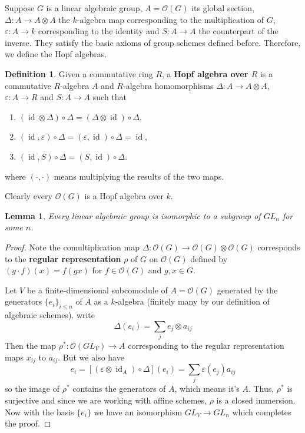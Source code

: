 \documentclass[12pt]{article}
\newtheorem{lemma}{Lemma}[section]
\theoremstyle{remark}
\theoremstyle{definition}
\newtheorem{definition}{Definition}[section]
\newcommand{\ve}[0]{\varepsilon}
\newcommand{\D}[0]{\Delta}
\newcommand{\id}[0]{\operatorname{id}}
\newcommand{\comment}[1]{}
\begin{document}
    Suppose $G$ is a linear algebraic group, $A=\mathcal O(G)$ its global section, $\D:A\to A\otimes A$ the $k$-algebra map corresponding to the multiplication of $G$, $\ve:A\to k$ corresponding to the identity and $S:A\to A$ the counterpart of the inverse. They satisfy the basic axioms of group schemes defined before. Therefore, we define the Hopf algebras.
    \begin{definition}
        Given a commutative ring $R$, a \textbf{Hopf algebra over $R$} is a commutative $R$-algebra $A$ and $R$-algebra homomorphisms $\D:A\to A\otimes A$, $\ve:A\to R$ and $S:A\to A$ such that
        \begin{enumerate}[\normalfont(i)]
            \item $(\id\otimes \D)\circ\D=(\D\otimes\id)\circ\D$,
            \item $(\id, \ve)\circ\D=(\ve,\id)\circ\D=\id$,
            \item $(\id, S)\circ\D=(S,\id)\circ\D$.
        \end{enumerate}
        where $(\cdot,\cdot)$ means multiplying the results of the two maps.
    \end{definition}
    Clearly every $\mathcal O(G)$ is a Hopf algebra over $k$.
    \begin{lemma}
        Every linear algebraic group is isomorphic to a subgroup of $GL_n$ for some $n$.
    \end{lemma}
    \begin{proof}
        \comment{We will argue with representations of $G$. We will use the idea of an $\mathcal O(G)$-comodule, which is a vector space $V$ over $k$ with a linear map $\rho:V\to V\otimes\mathcal O(G)$ such that $(\id_V\otimes\D)\circ\rho=(\rho\otimes\id_{\mathcal O(G)}\circ\rho)$ (this is just the associativity of the action of $G$) and $(\id_V\otimes \ve)\circ\rho=\id_V$.}
        Note the comultiplication map $\D:\mathcal O(G)\to \mathcal O(G)\otimes\mathcal O(G)$ corresponds to the \textbf{regular representation} $\rho$ of $G$ on $\mathcal O(G)$ defined by $(g\cdot f)(x)=f(gx)$ for $f\in \mathcal O(G)$ and $g,x\in G$.

        Let $V$ be a finite-dimensional subcomodule of $A=\mathcal O(G)$ generated by the generators $\{e_i\}_{i\leqslant n}$ of $A$ as a $k$-algebra (finitely many by our definition of algebraic schemes). write
        \[\D(e_i)=\sum_j e_j\otimes a_{ij}\]
        Then the map $\rho^*:\mathcal O(GL_V)\to A$ corresponding to the regular representation maps $x_{ij}$ to $a_{ij}$. But we also have
        \[e_i=[(\ve\otimes\id_A)\circ\D](e_i)=\sum_{j}\ve(e_j)a_{ij}\]
        so the image of $\rho^*$ contains the generators of $A$, which means it's $A$. Thus, $\rho^*$ is surjective and since we are working with affine schemes, $\rho$ is a closed immersion. Now with the basis $\{e_i\}$ we have an isomorphism $GL_V\to GL_n$ which completes the proof.
    \end{proof}
\end{document}
